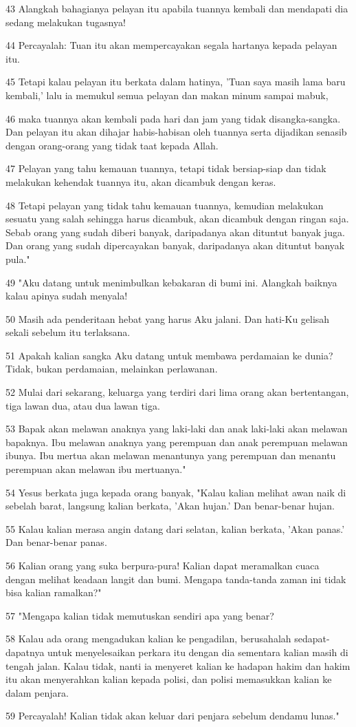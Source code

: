 \par 43 Alangkah bahagianya pelayan itu apabila tuannya kembali dan mendapati dia sedang melakukan tugasnya!
\par 44 Percayalah: Tuan itu akan mempercayakan segala hartanya kepada pelayan itu.
\par 45 Tetapi kalau pelayan itu berkata dalam hatinya, 'Tuan saya masih lama baru kembali,' lalu ia memukul semua pelayan dan makan minum sampai mabuk,
\par 46 maka tuannya akan kembali pada hari dan jam yang tidak disangka-sangka. Dan pelayan itu akan dihajar habis-habisan oleh tuannya serta dijadikan senasib dengan orang-orang yang tidak taat kepada Allah.
\par 47 Pelayan yang tahu kemauan tuannya, tetapi tidak bersiap-siap dan tidak melakukan kehendak tuannya itu, akan dicambuk dengan keras.
\par 48 Tetapi pelayan yang tidak tahu kemauan tuannya, kemudian melakukan sesuatu yang salah sehingga harus dicambuk, akan dicambuk dengan ringan saja. Sebab orang yang sudah diberi banyak, daripadanya akan dituntut banyak juga. Dan orang yang sudah dipercayakan banyak, daripadanya akan dituntut banyak pula."
\par 49 "Aku datang untuk menimbulkan kebakaran di bumi ini. Alangkah baiknya kalau apinya sudah menyala!
\par 50 Masih ada penderitaan hebat yang harus Aku jalani. Dan hati-Ku gelisah sekali sebelum itu terlaksana.
\par 51 Apakah kalian sangka Aku datang untuk membawa perdamaian ke dunia? Tidak, bukan perdamaian, melainkan perlawanan.
\par 52 Mulai dari sekarang, keluarga yang terdiri dari lima orang akan bertentangan, tiga lawan dua, atau dua lawan tiga.
\par 53 Bapak akan melawan anaknya yang laki-laki dan anak laki-laki akan melawan bapaknya. Ibu melawan anaknya yang perempuan dan anak perempuan melawan ibunya. Ibu mertua akan melawan menantunya yang perempuan dan menantu perempuan akan melawan ibu mertuanya."
\par 54 Yesus berkata juga kepada orang banyak, "Kalau kalian melihat awan naik di sebelah barat, langsung kalian berkata, 'Akan hujan.' Dan benar-benar hujan.
\par 55 Kalau kalian merasa angin datang dari selatan, kalian berkata, 'Akan panas.' Dan benar-benar panas.
\par 56 Kalian orang yang suka berpura-pura! Kalian dapat meramalkan cuaca dengan melihat keadaan langit dan bumi. Mengapa tanda-tanda zaman ini tidak bisa kalian ramalkan?"
\par 57 "Mengapa kalian tidak memutuskan sendiri apa yang benar?
\par 58 Kalau ada orang mengadukan kalian ke pengadilan, berusahalah sedapat-dapatnya untuk menyelesaikan perkara itu dengan dia sementara kalian masih di tengah jalan. Kalau tidak, nanti ia menyeret kalian ke hadapan hakim dan hakim itu akan menyerahkan kalian kepada polisi, dan polisi memasukkan kalian ke dalam penjara.
\par 59 Percayalah! Kalian tidak akan keluar dari penjara sebelum dendamu lunas."


